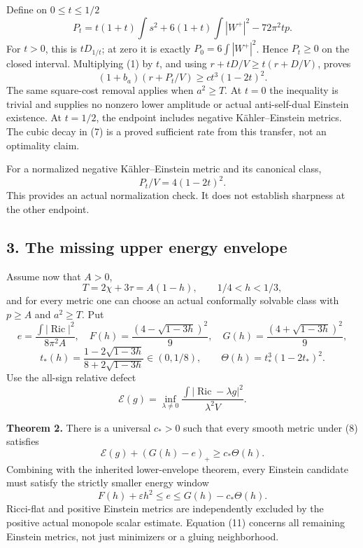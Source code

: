 \documentclass[
  10pt,
]{article}
\begin{document}
Define on \(0\le t\le1/2\) \[
 P_t=t(1+t)\int s^2+6(1+t)\int|W^+|^2-72\pi^2tp.
                                                               \tag{6}
\] For \(t>0\), this is \(tD_{1/t}\); at zero it is exactly
\(P_0=6\int|W^+|^2\). Hence \(P_t\ge0\) on the closed interval.
Multiplying (1) by \(t\), and using \(r+tD/V\ge t(r+D/V)\), proves \[
 \boxed{(1+b_a)(r+P_t/V)\ge c t^3(1-2t)^2.}             \tag{7}
\] The same square-cost removal applies when \(a^2\ge T\). At \(t=0\)
the inequality is trivial and supplies no nonzero lower amplitude or
actual anti-self-dual Einstein existence. At \(t=1/2\), the endpoint
includes negative Kähler--Einstein metrics. The cubic decay in (7) is a
proved sufficient rate from this transfer, not an optimality claim.

For a normalized negative Kähler--Einstein metric and its canonical
class, \[
 P_t/V=4(1-2t)^2.
\] This provides an actual normalization check. It does not establish
sharpness at the other endpoint.

\hypertarget{the-missing-upper-energy-envelope}{%
\subsection{3. The missing upper energy
envelope}\label{the-missing-upper-energy-envelope}}

Assume now that \(A>0\), \[
 T=2\chi+3\tau=A(1-h),\qquad 1/4<h<1/3,                 \tag{8}
\] and for every metric one can choose an actual conformally solvable
class with \(p\ge A\) and \(a^2\ge T\). Put \[
 e=\frac{\int|\operatorname{Ric}|^2}{8\pi^2A},\quad
 F(h)=\frac{(4-\sqrt{1-3h})^2}{9},\quad
 G(h)=\frac{(4+\sqrt{1-3h})^2}{9},
\] \[
 t_*(h)=\frac{1-2\sqrt{1-3h}}{8+2\sqrt{1-3h}}\in(0,1/8),
 \qquad \Theta(h)=t_*^3(1-2t_*)^2.                       \tag{9}
\] Use the all-sign relative defect \[
 \mathcal E(g)=\inf_{\lambda\ne0}
 \frac{\int|\operatorname{Ric}-\lambda g|^2}{\lambda^2V}.
\]

\textbf{Theorem 2.} There is a universal \(c_*>0\) such that every
smooth metric under (8) satisfies \[
 \boxed{\mathcal E(g)+(G(h)-e)_+\ge c_*\Theta(h).}        \tag{10}
\] Combining with the inherited lower-envelope theorem, every Einstein
candidate must satisfy the strictly smaller energy window \[
 \boxed{F(h)+\varepsilon h^2\le e
                       \le G(h)-c_*\Theta(h).}          \tag{11}
\] Ricci-flat and positive Einstein metrics are independently excluded
by the positive actual monopole scalar estimate. Equation (11) concerns
all remaining Einstein metrics, not just minimizers or a gluing
neighborhood.
\end{document}
